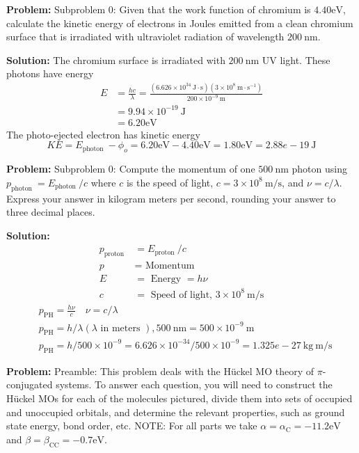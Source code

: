 \documentclass[10pt]{article}
\begin{document}
\textbf{Problem:}
Subproblem 0: Given that the work function of chromium is $4.40 \mathrm{eV}$, calculate the kinetic energy of electrons in Joules emitted from a clean chromium surface that is irradiated with ultraviolet radiation of wavelength $200 \mathrm{~nm}$.


\textbf{Solution:}
The chromium surface is irradiated with $200 \mathrm{~nm}$ UV light. These photons have energy
\[
\begin{aligned}
E &=\frac{h c}{\lambda}=\frac{\left(6.626 \times 10^{34} \mathrm{~J} \cdot \mathrm{s}\right)\left(3 \times 10^{8} \mathrm{~m} \cdot \mathrm{s}^{-1}\right)}{200 \times 10^{-9} \mathrm{~m}} \\
&=9.94 \times 10^{-19} \mathrm{~J} \\
&=6.20 \mathrm{eV}
\end{aligned}
\]
The photo-ejected electron has kinetic energy
\[
K E=E_{\text {photon }}-\phi_{o}=6.20 \mathrm{eV}-4.40 \mathrm{eV}=1.80 \mathrm{eV}=\boxed{2.88e-19} \mathrm{~J}
\]


\textbf{Problem:}
Subproblem 0: Compute the momentum of one $500 \mathrm{~nm}$ photon using $p_{\text {photon }}=E_{\text {photon }} / c$ where $c$ is the speed of light, $c=3 \times 10^{8} \mathrm{~m} / \mathrm{s}$, and $\nu=c / \lambda$.  Express your answer in kilogram meters per second, rounding your answer to three decimal places.


\textbf{Solution:}
\[
\begin{aligned}
p_{\text {proton }} &=E_{\text {proton }} / c \\
p &=\text { Momentum } \\
E &=\text { Energy }=h \nu \\
c &=\text { Speed of light, } 3 \times 10^{8} \mathrm{~m} / \mathrm{s}
\end{aligned}
\]
\[
\begin{aligned}
& p_{\mathrm{PH}}=\frac{h \nu}{c} \quad \nu=c / \lambda \\
& p_{\mathrm{PH}}=h / \lambda(\lambda \text { in meters }), 500 \mathrm{~nm}=500 \times 10^{-9} \mathrm{~m} \\
& p_{\mathrm{PH}}=h / 500 \times 10^{-9}=6.626 \times 10^{-34} / 500 \times 10^{-9}=\boxed{1.325e-27} \mathrm{~kg} \mathrm{~m} / \mathrm{s}
\end{aligned}
\]


\textbf{Problem:}
Preamble: This problem deals with the H\"uckel MO theory of $\pi$-conjugated systems.
To answer each question, you will need to construct the Hückel MOs for each of the molecules pictured, divide them into sets of occupied and unoccupied orbitals, and determine the relevant properties, such as ground state energy, bond order, etc.
NOTE: For all parts we take $\alpha=\alpha_{\mathrm{C}}=-11.2 \mathrm{eV}$ and $\beta=\beta_{\mathrm{CC}}=-0.7 \mathrm{eV}$.
\end{document}
